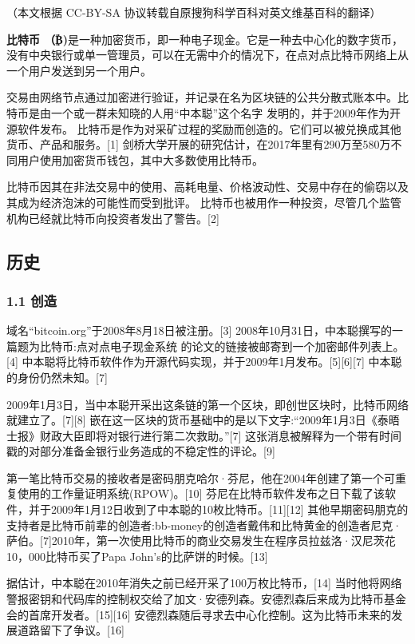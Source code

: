 
（本文根据 CC-BY-SA 协议转载自原搜狗科学百科对英文维基百科的翻译）

\textbf{比特币 （₿)}是一种加密货币，即一种电子现金。它是一种去中心化的数字货币，没有中央银行或单一管理员，可以在无需中介的情况下，在点对点比特币网络上从一个用户发送到另一个用户。

交易由网络节点通过加密进行验证，并记录在名为区块链的公共分散式账本中。比特币是由一个或一群未知晓的人用“中本聪”这个名字 发明的，并于2009年作为开源软件发布。 比特币是作为对采矿过程的奖励而创造的。它们可以被兑换成其他货币、产品和服务。[1] 剑桥大学开展的研究估计，在2017年里有290万至580万不同用户使用加密货币钱包，其中大多数使用比特币。

比特币因其在非法交易中的使用、高耗电量、价格波动性、交易中存在的偷窃以及其成为经济泡沫的可能性而受到批评。 比特币也被用作一种投资，尽管几个监管机构已经就比特币向投资者发出了警告。[2]

\subsection{历史}
\subsubsection{1.1 创造}
域名“bitcoin.org”于2008年8月18日被注册。[3] 2008年10月31日，中本聪撰写的一篇题为比特币:点对点电子现金系统 的论文的链接被邮寄到一个加密邮件列表上。[4] 中本聪将比特币软件作为开源代码实现，并于2009年1月发布。[5][6][7] 中本聪的身份仍然未知。[7]

2009年1月3日，当中本聪开采出这条链的第一个区块，即创世区块时，比特币网络就建立了。[7][8] 嵌在这一区块的货币基础中的是以下文字:“2009年1月3日《泰晤士报》财政大臣即将对银行进行第二次救助。”[7] 这张消息被解释为一个带有时间戳的对部分准备金银行业务造成的不稳定性的评论。[9]

第一笔比特币交易的接收者是密码朋克哈尔·芬尼，他在2004年创建了第一个可重复使用的工作量证明系统(RPOW)。[10] 芬尼在比特币软件发布之日下载了该软件，并于2009年1月12日收到了中本聪的10枚比特币。[11][12] 其他早期密码朋克的支持者是比特币前辈的创造者:bb-money的创造者戴伟和比特黄金的创造者尼克·萨伯。[7]2010年，第一次使用比特币的商业交易发生在程序员拉兹洛·汉尼茨花10，000比特币买了Papa John's的比萨饼的时候。[13]

据估计，中本聪在2010年消失之前已经开采了100万枚比特币，[14] 当时他将网络警报密钥和代码库的控制权交给了加文·安德列森。安德烈森后来成为比特币基金会的首席开发者。[15][16] 安德烈森随后寻求去中心化控制。这为比特币未来的发展道路留下了争议。[16]
